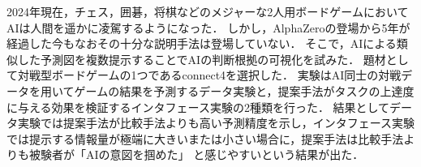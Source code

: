 \abstract
2024年現在，チェス，囲碁，将棋などのメジャーな2人用ボードゲームにおいてAIは人間を遥かに凌駕するようになった\cite{Nikkei}\cite{deepBlue}\cite{dennou}．
しかし，AlphaZero\cite{AlphaZero}の登場から5年が経過した今もなおその十分な説明手法は登場していない．
そこで，AIによる類似した予測図を複数提示することでAIの判断根拠の可視化を試みた．
題材として対戦型ボードゲームの1つであるconnect4\cite{connect4}を選択した．
実験はAI同士の対戦データを用いてゲームの結果を予測するデータ実験と，提案手法がタスクの上達度に与える効果を検証するインタフェース実験の2種類を行った．
結果としてデータ実験では提案手法が比較手法よりも高い予測精度を示し，インタフェース実験では提示する情報量が極端に大きいまたは小さい場合に，提案手法は比較手法よりも被験者が「AIの意図を掴めた」
と感じやすいという結果が出た．